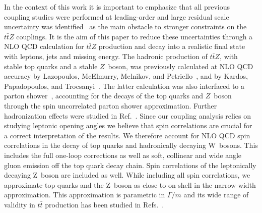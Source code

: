 \documentclass[preprint]{JHEP3}
\def\Dphill{\Delta \phi_{ll}}
\def\ttbZ{t\bar{t}Z}
\def\ttb{t\bar{t}}
\def\ptZ{p_{t,Z}}
\begin{document}
In the context of this work it is important to emphasize that all previous coupling studies were performed at leading-order and large residual scale uncertainty 
was identified~\cite{Baur:2004uw} as the main obstacle to stronger constraints on the $\ttbZ$ couplings.
It is the aim of this paper to reduce these uncertainties through a NLO QCD calculation for $\ttbZ$ production and decay into a realistic final state with leptons, jets and missing energy.
The hadronic production of $\ttbZ$, with stable top quarks and a stable $Z$~boson, was previously calculated at NLO QCD accuracy by 
Lazopoulos, McElmurry, Melnikov, and Petriello~\cite{Lazopoulos:2008de}, and  by Kardos, Papadopoulos, and Trocsanyi~\cite{Kardos:2011na}.
The latter calculation was also interfaced to a parton shower~\cite{Garzelli:2011is}, accounting for the decays of the top quarks and $Z$~boson through 
the spin uncorrelated parton shower approximation.
Further hadronization effects were studied in Ref.~\cite{Garzelli:2012bn}.
Since our coupling analysis relies on studying leptonic opening angles we believe that spin correlations are crucial for a correct interpretation of the results.
We therefore account for NLO QCD spin correlations in the decay of top quarks and hadronically decaying W~bosons.
This includes the full one-loop corrections as well as soft, collinear and wide angle gluon emission off the top quark decay chain.
Spin correlations of the leptonically decaying Z~boson are included as well.
While including all spin correlations, we approximate top quarks and the Z~boson as close to on-shell in the narrow-width approximation.
This approximation is parametric in $\Gamma/m$ and its wide range of validity in $\ttb$ production has been studied in Refs.~\cite{Buttar:2008jx,Denner:2012yc,Bevilacqua:2010qb,Heinrich:2013qaa}.
\end{document}
